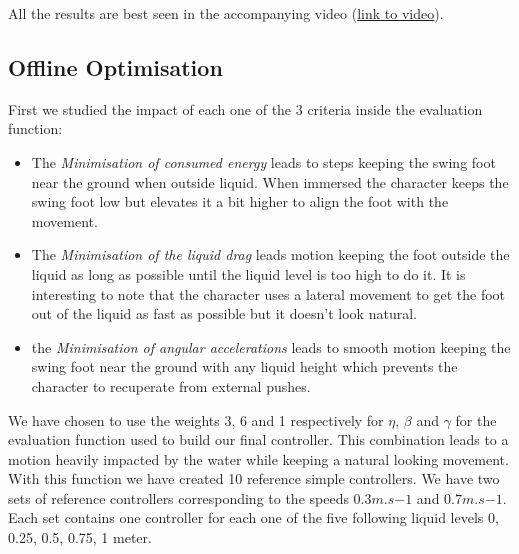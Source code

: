 \documentclass[conference]{acmsiggraph}
\begin{document}
All the results are best seen in the accompanying video (\href{https://drive.google.com/folderview?id=0B6n5UVMEGbGHfjM5a1phUHZGaUtLNVRNanFDT2xRd19zN0x1UmNabjlCVGN6c1ZFdWRLczA&usp=sharing}{link to video}). 

\subsection{Offline Optimisation}
First we studied the impact of each one of the 3 criteria inside the evaluation function:
\begin{itemize}
\item{The \textit{Minimisation of consumed energy} leads to steps keeping the swing foot near the ground when outside liquid. When immersed the character keeps the swing foot low but elevates it a bit higher to align the foot with the movement.}
\item{The \textit{Minimisation of the liquid drag} leads motion keeping the foot outside the liquid as long as possible until the liquid level is too high to do it. It is interesting to note that the character uses a lateral movement to get the foot out of the liquid as fast as possible but it doesn't look natural.}
\item{the \textit{Minimisation of angular accelerations} leads to smooth motion keeping the swing foot near the ground with any liquid height which prevents the character to recuperate from external pushes.}
\end{itemize}
We have chosen to use the weights 3, 6 and 1 respectively for $\eta$, $\beta$ and $\gamma$ for the evaluation function used to build our final controller. This combination leads to a motion heavily impacted by the water while keeping a natural looking movement. 
With this function we have created 10 reference simple controllers. We have two sets of reference controllers corresponding to the speeds $0.3m.s{-1}$ and $0.7m.s{-1}$. Each set contains one controller for each one of the five following liquid levels 0, 0.25, 0.5, 0.75, 1 meter.
\end{document}
